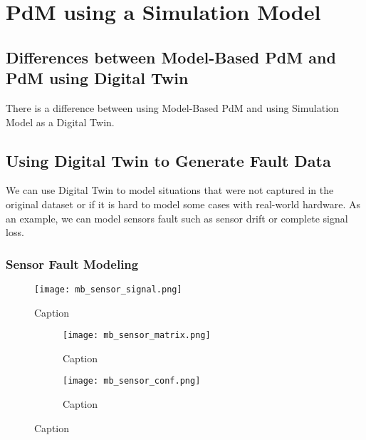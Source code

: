 %


\chapter{PdM using a Simulation Model}

\section{Differences between Model-Based PdM and PdM using Digital Twin}
There is a difference between using Model-Based PdM and using Simulation
Model as a Digital Twin.

\section{Using Digital Twin to Generate Fault Data}
We can use Digital Twin to model situations that were not captured in the
original dataset or if it is hard to model some cases with real-world
hardware. As an example, we can model sensors fault such as sensor drift or
complete signal loss.

\subsection{Sensor Fault Modeling}

\begin{figure}[h!]
    \centering
    \texttt{[image: mb\_sensor\_signal.png]}
    \caption{Caption}
    \label{fig:}
\end{figure}

\begin{figure}
    \centering
    \begin{subfigure}[b]{0.45\textwidth}
        \centering
        \texttt{[image: mb\_sensor\_matrix.png]}
        \caption{Caption}
        \label{fig:}
    \end{subfigure}
    \hfill
    \begin{subfigure}[b]{0.45\textwidth}
        \centering
        \texttt{[image: mb\_sensor\_conf.png]}
        \caption{Caption}
        \label{fig:}
    \end{subfigure}
    \caption{Caption}
    \label{fig:}
\end{figure}



